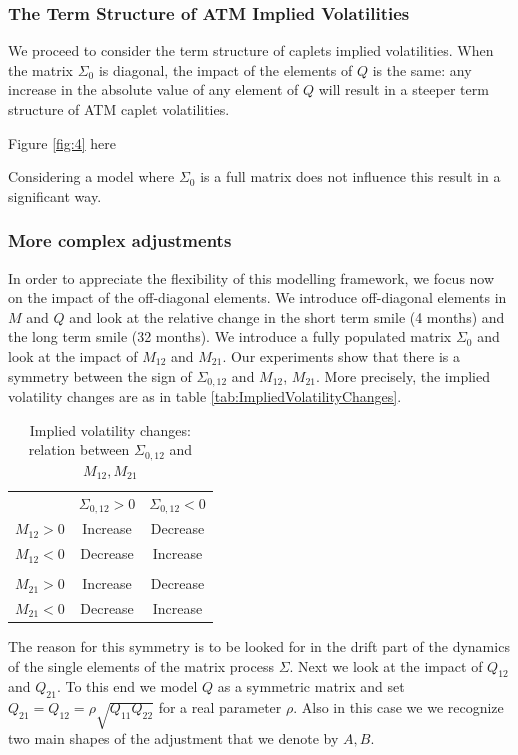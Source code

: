 \subsubsection{The Term Structure of ATM Implied Volatilities}
We proceed to consider the term structure of caplets implied volatilities. When the matrix $\Sigma_0$ is diagonal, the impact of the elements of $Q$ is the same: any increase in the absolute value of any element of $Q$ will result in a steeper term structure of ATM caplet volatilities.
\begin{center}
Figure \eqref{fig:4}  here
\end{center}
Considering a model where $\Sigma_0$ is a full matrix does not influence this result in a significant way.

\subsubsection{More complex adjustments}
In order to appreciate the flexibility of this modelling framework, we focus now on the impact of the off-diagonal elements. We introduce off-diagonal elements in $M$ and $Q$ and look at the relative change in the short term smile (4 months) and the long term smile (32 months).
We introduce a fully populated matrix $\Sigma_0$ and look at the impact of $M_{12}$ and $M_{21}$. Our experiments show that there is a symmetry between the sign of $\Sigma_{0,12}$ and $M_{12}$, $M_{21}$. More precisely, the implied volatility changes are as in table \eqref{tab:ImpliedVolatilityChanges}.	
\begin{table}[h]
\centering
	\begin{tabular}{ccc}
	 &$\Sigma_{0,12}>0$&$\Sigma_{0,12}<0$\\
	 $M_{12}>0$&Increase&Decrease\\
	 $M_{12}<0$&Decrease&Increase \\
	 &&\\
   $M_{21}>0$&Increase&Decrease\\
	 $M_{21}<0$&Decrease&Increase \\
	\end{tabular}
	\caption{Implied volatility changes: relation between $\Sigma_{0,12}$ and $M_{12},M_{21}$}
	\label{tab:ImpliedVolatilityChanges}
\end{table}
The reason for this symmetry is to be looked for in the drift part of the dynamics of the single elements of the matrix process $\Sigma$.
Next we look at the impact of $Q_{12}$ and $Q_{21}$. To this end we model $Q$ as a symmetric matrix and set $Q_{21}=Q_{12}=\rho\sqrt{Q_{11}Q_{22}}$ for a real parameter $\rho$. Also in this case we we recognize two main shapes of the adjustment that we denote by $A,B$.

